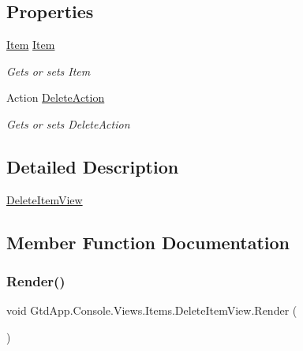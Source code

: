 \subsection*{Properties}
\begin{DoxyCompactItemize}
\item 
\mbox{\hyperlink{class_gtd_app_1_1_data_1_1_item}{Item}} \mbox{\hyperlink{class_gtd_app_1_1_console_1_1_views_1_1_items_1_1_delete_item_view_ac6a812e3f9fb841b03bb527304a0d097}{Item}}
\begin{DoxyCompactList}\small\item\em Gets or sets Item \end{DoxyCompactList}\item 
Action \mbox{\hyperlink{class_gtd_app_1_1_console_1_1_views_1_1_items_1_1_delete_item_view_a4dd7e17f122809f3330e2b5245ef1125}{Delete\+Action}}
\begin{DoxyCompactList}\small\item\em Gets or sets Delete\+Action \end{DoxyCompactList}\end{DoxyCompactItemize}


\subsection{Detailed Description}
\mbox{\hyperlink{class_gtd_app_1_1_console_1_1_views_1_1_items_1_1_delete_item_view}{Delete\+Item\+View}} 



\subsection{Member Function Documentation}
\mbox{\label{class_gtd_app_1_1_console_1_1_views_1_1_items_1_1_delete_item_view_acce0bea7842b8ba472083fcfc21329f0}} 
\subsubsection{\texorpdfstring{Render()}{Render()}}
{\footnotesize\ttfamily void Gtd\+App.\+Console.\+Views.\+Items.\+Delete\+Item\+View.\+Render (\begin{DoxyParamCaption}{ }\end{DoxyParamCaption})}



